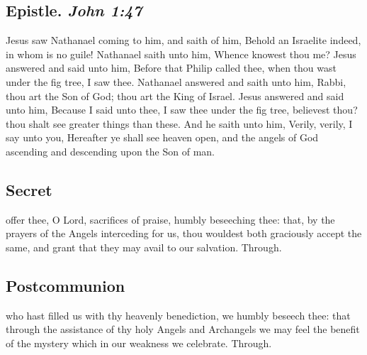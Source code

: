 
\subsection{Epistle. {\itshape John 1:47}}
 Jesus saw Nathanael coming to him, and saith of him, Behold an Israelite indeed, in whom is no guile! Nathanael saith unto him, Whence knowest thou me? Jesus answered and said unto him, Before that Philip called thee, when thou wast under the fig tree, I saw thee. Nathanael answered and saith unto him, Rabbi, thou art the Son of God; thou art the King of Israel. Jesus answered and said unto him, Because I said unto thee, I saw thee under the fig tree, believest thou? thou shalt see greater things than these. And he saith unto him, Verily, verily, I say unto you, Hereafter ye shall see heaven open, and the angels of God ascending and descending upon the Son of man.


\subsection{Secret}
 offer thee, O Lord, sacrifices of praise, humbly beseeching thee: that, by the prayers of the Angels interceding for us, thou wouldest both graciously accept the same, and grant that they may avail to our salvation. Through.


\subsection{Postcommunion}
 who hast filled us with thy heavenly benediction, we humbly beseech thee: that through the assistance of thy holy Angels and Archangels we may feel the benefit of the mystery which in our weakness we celebrate. Through.

